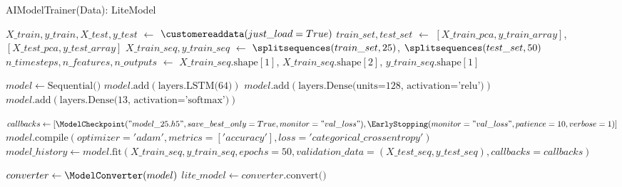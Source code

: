 \documentclass[11pt]{article}
\begin{document}
	\begin{algorithm}[h]	
		
		\caption{AIModelTrainer(Data): LiteModel}
		
		$X\_train, y\_train, X\_test, y\_test$ $\leftarrow$ $\text{\customereaddata}(just\_load=True)$\;
		$train\_set, test\_set$ $\leftarrow$ $[X\_train\_pca, y\_train\_array]$, $[X\_test\_pca, y\_test\_array]$\;
		$X\_train\_seq, y\_train\_seq$ $\leftarrow$ $\text{\splitsequences}(train\_set, 25)$, $\text{\splitsequences}(test\_set, 50)$\;
		$n\_timesteps, n\_features, n\_outputs$ $\leftarrow$ $X\_train\_seq.\text{shape}[1]$, $X\_train\_seq.\text{shape}[2]$, $y\_train\_seq.\text{shape}[1]$\;
		
		$model \leftarrow \text{Sequential()}$\;
		$model.\text{add}(\text{layers.LSTM(64)})$\;
		$model.\text{add}(\text{layers.Dense(units=128, activation='relu')})$\;
		$model.\text{add}(\text{layers.Dense(13, activation='softmax')})$\;
		
		$callbacks \leftarrow [\text{\ModelCheckpoint}("model\_25.h5", save\_best\_only=True, monitor="val\_loss"), \text{\EarlyStopping}(monitor="val\_loss", patience=10, verbose=1)]$\;
		$model.\text{compile}(optimizer='adam', metrics=['accuracy'], loss='categorical\_crossentropy')$\;
		$model\_history \leftarrow model.\text{fit}(X\_train\_seq, y\_train\_seq, epochs=50, validation\_data=(X\_test\_seq, y\_test\_seq), callbacks=callbacks)$\;
		
		$converter \leftarrow \text{\ModelConverter}(model)$\;
		$lite\_model \leftarrow converter.\text{convert()}$\;
	\end{algorithm}
	
\end{document}
